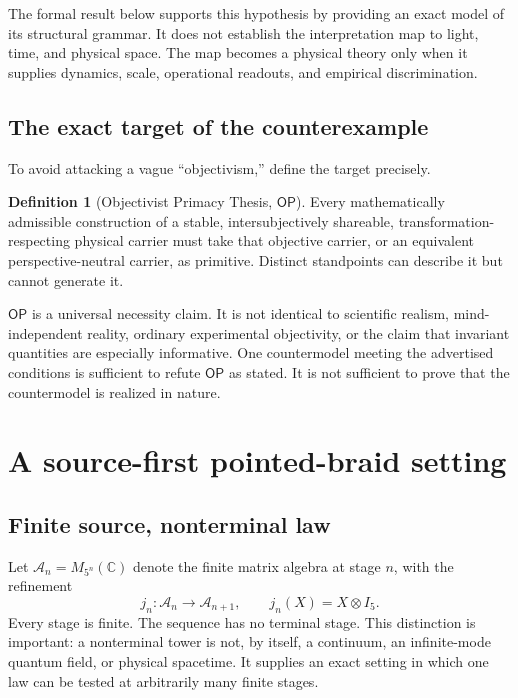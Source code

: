 \documentclass[11pt]{article}
\theoremstyle{definition}
\newtheorem{definition}[theorem]{Definition}
\theoremstyle{remark}
\newcommand{\cA}{\mathcal{A}}
\newcommand{\OPT}{\mathsf{OP}}
\begin{document}
The formal result below supports this hypothesis by providing an exact model of its structural grammar. It does not establish the interpretation map to light, time, and physical space. The map becomes a physical theory only when it supplies dynamics, scale, operational readouts, and empirical discrimination.

\subsection{The exact target of the counterexample}

To avoid attacking a vague ``objectivism,'' define the target precisely.

\begin{definition}[Objectivist Primacy Thesis, $\OPT$]\label{def:opt}
Every mathematically admissible construction of a stable, intersubjectively shareable, transformation-respecting physical carrier must take that objective carrier, or an equivalent perspective-neutral carrier, as primitive. Distinct standpoints can describe it but cannot generate it.
\end{definition}

$\OPT$ is a universal necessity claim. It is not identical to scientific realism, mind-independent reality, ordinary experimental objectivity, or the claim that invariant quantities are especially informative. One countermodel meeting the advertised conditions is sufficient to refute $\OPT$ as stated. It is not sufficient to prove that the countermodel is realized in nature.

\section{A source-first pointed-braid setting}

\subsection{Finite source, nonterminal law}

Let $\cA_n=M_{5^n}(\mathbb C)$ denote the finite matrix algebra at stage $n$, with the refinement
\begin{equation}\label{eq:refinement}
 j_n:\cA_n\longrightarrow\cA_{n+1},\qquad j_n(X)=X\otimes I_5.
\end{equation}
Every stage is finite. The sequence has no terminal stage. This distinction is important: a nonterminal tower is not, by itself, a continuum, an infinite-mode quantum field, or physical spacetime. It supplies an exact setting in which one law can be tested at arbitrarily many finite stages.
\end{document}
